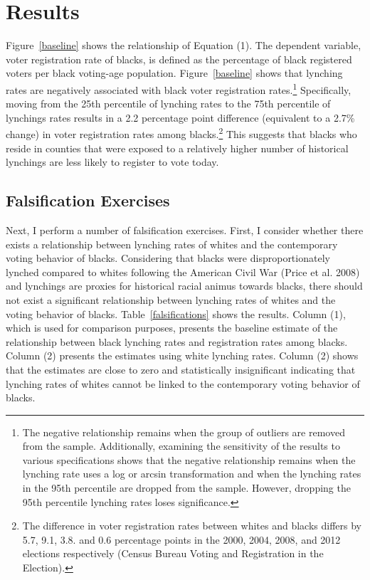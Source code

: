 \documentclass[AEJ, finalmode]{AEA}
\begin{document}
\section{Results}

Figure~\ref{baseline} shows the relationship of Equation (1). The dependent variable, voter registration rate of blacks, is defined as the percentage of black registered voters per black voting-age population. Figure~\ref{baseline} shows that lynching rates are negatively associated with black voter registration rates.\footnote{The negative relationship remains when the group of outliers are removed from the sample. Additionally, examining the sensitivity of the results to various specifications shows that the negative relationship remains when the lynching rate uses a log or arcsin transformation and when the lynching rates in the 95th percentile are dropped from the sample. However, dropping the 95th percentile lynching rates loses significance.} Specifically, moving from the 25th percentile of lynching rates to the 75th percentile of lynchings rates results in a 2.2 percentage point difference (equivalent to a 2.7\% change) in voter registration rates among blacks.\footnote{The difference in voter registration rates between whites and blacks differs by 5.7, 9.1, 3.8. and 0.6 percentage points in the 2000, 2004, 2008, and 2012 elections respectively (Census Bureau Voting and Registration in the Election).} This suggests that blacks who reside in counties that were exposed to a relatively higher number of historical lynchings are less likely to register to vote today. 

\subsection{Falsification Exercises}

Next, I perform a number of falsification exercises. First, I consider whether there exists a relationship between lynching rates of whites and the contemporary voting behavior of blacks. Considering that blacks were disproportionately lynched compared to whites following the American Civil War (Price et al. 2008) and lynchings are proxies for historical racial animus towards blacks, there should not exist a significant relationship between lynching rates of whites and the voting behavior of blacks. Table~\ref{falsifications} shows the results. Column (1), which is used for comparison purposes, presents the baseline estimate of the relationship between black lynching rates and registration rates among blacks. Column (2) presents the estimates using white lynching rates. Column (2) shows that the estimates are close to zero and statistically insignificant indicating that lynching rates of whites cannot be linked to the contemporary voting behavior of blacks. 
\end{document}
